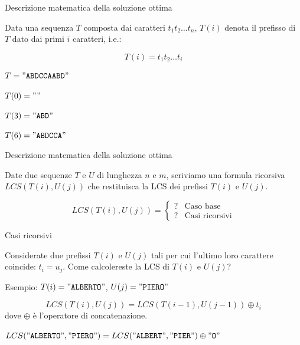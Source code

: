 \begin{frame}{Descrizione matematica della soluzione ottima}

\vspace{-9pt}
\begin{myboxtitle}
Data una sequenza $T$ composta dai caratteri $t_1t_2{\ldots}t_n$, $T(i)$ denota 
il \alert{prefisso} di $T$ dato dai primi $i$ caratteri, i.e.:

\[
  T(i) = t_1t_2{\ldots}t_i
\]
\end{myboxtitle}

\begin{myboxtitle}[Esempi]
\BIL
\item $T = \mathtt{"ABDCCAABD"}$
\item $T(0) = \mathtt{""}$
\item $T(3) = \mathtt{"ABD"}$
\item $T(6) = \mathtt{"ABDCCA"}$
\EIL
\end{myboxtitle}
\end{frame}

\begin{frame}{Descrizione matematica della soluzione ottima}

\vspace{-9pt}
Date due sequenze $T$ e $U$ di lunghezza $n$ e $m$, scriviamo
una formula ricorsiva $LCS(T(i), U(j))$ che restituisca la LCS 
dei prefissi $T(i)$ e $U(j)$.

\[
  LCS(T(i), U(j)) = \begin{cases}
   ? & \textrm{Caso base} \\
   ? & \textrm{Casi ricorsivi}
  \end{cases}
\]

\end{frame}

\begin{frame}{Casi ricorsivi}

\vspace{-9pt}

Considerate due prefissi $T(i)$ e $U(j)$ tali per cui l'ultimo loro
carattere coincide: $t_i = u_j$. Come calcolereste la  LCS di $T(i)$ e $U(j)$?

\BIL
\item Esempio: $T(i)="\texttt{ALBERTO}"$, $U(j)="\texttt{PIERO}"$
\EIL

\pause
\bigskip
{}
\[
  LCS(T(i),U(j)) = LCS(T(i-1), U(j-1)) \oplus t_i
\]
dove $\oplus$ è l'operatore di concatenazione.

\BIL
\item $LCS("\texttt{ALBERTO}","\texttt{PIERO}") = LCS("\texttt{ALBERT}","\texttt{PIER}") \oplus "\mathtt{O}"$
\EIL

\end{frame}

